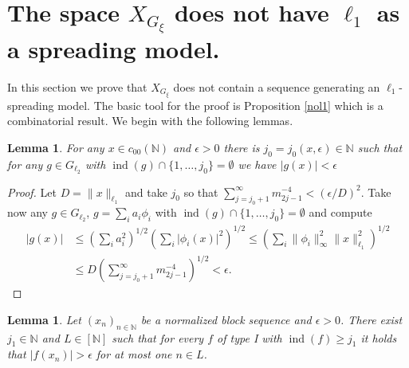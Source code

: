 \documentclass[a4paper]{amsart}
\theoremstyle{plain}
\newtheorem{lemma}[theorem]{Lemma}
\newcommand{\N}{\mathbb{N}}
\newcommand{\e}{\epsilon}
\newcommand{\norm}[1][\cdot]{\lVert #1\rVert}
\newcommand{\xn}[1][x]{(#1_{n})_{n\in\N}}
\DeclareMathOperator{\ind}{ind}
\begin{document}
\section{The space $X_{G_{\xi}}$ does  not have $\ell_{1}$ as a spreading model.}\label{sec6}
In this section we prove that  $X_{G_{\xi}}$ does not contain a sequence generating  an $\ell_{1}$-spreading model. The basic tool for the proof is  Proposition \ref{nol1} which is a combinatorial result.
We begin with the following lemmas.
\begin{lemma}\label{ll1a}
For any $x\in c_{00}(\N)$ and $\e>0$ there is $j_{0}=j_0(x,\e)\in\N$
such that for any $g\in
G_{\ell_2}$ with $\ind (g)\cap \{1,\dots,j_0\}=\emptyset$ we have $\vert g(x)\vert<\e$
\end{lemma}
\begin{proof}
Let $D=\norm[x]_{\ell_{1}}$ and take $j_0$ so that
$\sum_{j=j_0+1}^{\infty}m_{2j-1}^{-4}<(\e/D)^2$. Take now any $g\in G_{\ell_2}$,
$g=\sum_ia_i\phi_i$ with $\ind (g)\cap \{1,\dots, j_0\}=\emptyset$ and compute
\begin{align*}
\vert g(x)\vert&\leq (\sum_ia_i^2)^{1/2}(\sum_i\vert \phi_i(x)\vert^2)^{1/2}\leq
(\sum_i\norm[\phi_i]_{\infty}^2\norm[x]_{\ell_{1}}^2)^{1/2}
\\
&\leq D(\sum_{j=j_0+1}^{\infty}m_{2j-1}^{-4})^{1/2}<\e.
\end{align*}
\end{proof}
\begin{lemma}\label{ll2}
Let $\xn$ be a  normalized block sequence and $\e>0$. There exist
$j_{1}\in\N$ and $L\in [\N]$ such that for every $f$ of type I
with $\ind(f)\geq j_1$ it holds that $\vert f(x_n)\vert>\e$ for at
most one $n\in L$.
\end{lemma}
\end{document}
